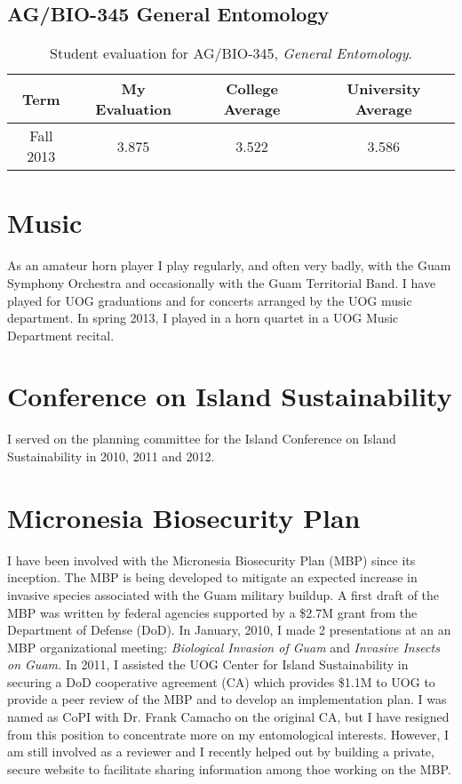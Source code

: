 \documentclass[12pt,oneside,english]{scrbook}
\begin{document}
\subsection{AG/BIO-345 General Entomology}

\begin{table}[h]
\protect\caption{\label{tab:Student-evaluation}Student evaluation for AG/BIO-345, \emph{General Entomology}.}
\centering{}%
\begin{tabular}{cccc}
\hline 
Term & My Evaluation & College Average & University Average\tabularnewline
\hline 
Fall 2013 & 3.875 & 3.522 & 3.586\tabularnewline
\hline 
\end{tabular}
\end{table}

\section{Music}

As an amateur horn player I play regularly, and often very badly,
with the Guam Symphony Orchestra and occasionally with the Guam Territorial
Band. I have played for UOG graduations and for concerts arranged
by the UOG music department. In spring 2013, I played in a horn quartet
in a UOG Music Department recital.

\section{Conference on Island Sustainability}

I served on the planning committee for the Island Conference on Island
Sustainability in 2010, 2011 and 2012.

\section{Micronesia Biosecurity Plan}

I have been involved with the Micronesia Biosecurity Plan (MBP) since
its inception. The MBP is being developed to mitigate an expected
increase in invasive species associated with the Guam military buildup.
A first draft of the MBP was written by federal agencies supported
by a \$2.7M grant from the Department of Defense (DoD). In January,
2010, I made 2 presentations at an an MBP organizational meeting:
\emph{Biological Invasion of Guam} and \emph{Invasive Insects on Guam.}
In 2011, I assisted the UOG Center for Island Sustainability in securing
a DoD cooperative agreement (CA) which provides \$1.1M to UOG to provide
a peer review of the MBP and to develop an implementation plan. I
was named as CoPI with Dr. Frank Camacho on the original CA, but I
have resigned from this position to concentrate more on my entomological
interests. However, I am still involved as a reviewer and I recently
helped out by building a private, secure website to facilitate sharing
information among thoe working on the MBP.
\end{document}
